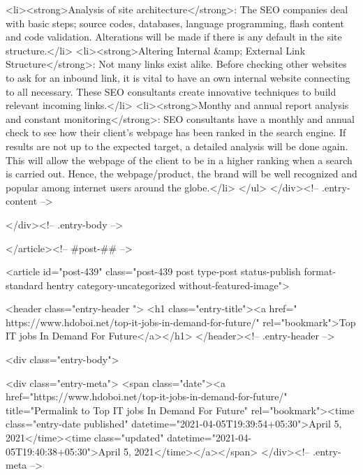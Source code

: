 <li><strong>Analysis of site architecture</strong>: The SEO companies deal with basic steps; source codes, databases, language programming, flash content and code validation. Alterations will be made if there is any default in the site structure.</li>
<li><strong>Altering Internal &amp; External Link Structure</strong>: Not many links exist alike. Before checking other websites to ask for an inbound link, it is vital to have an own internal website connecting to all necessary. These SEO consultants create innovative techniques to build relevant incoming links.</li>
<li><strong>Monthy and annual report analysis and constant monitoring</strong>: SEO consultants have a monthly and annual check to see how their client’s webpage has been ranked in the search engine. If results are not up to the expected target, a detailed analysis will be done again. This will allow the webpage of the client to be in a higher ranking when a search is carried out. Hence, the webpage/product, the brand will be well recognized and popular among internet users around the globe.</li>
</ul>
					</div><!-- .entry-content -->
		
		
			</div><!-- .entry-body -->

</article><!-- #post-## -->

			
				
<article id="post-439" class="post-439 post type-post status-publish format-standard hentry category-uncategorized without-featured-image">

	
	<header class="entry-header ">
					<h1 class="entry-title"><a href=" https://www.hdoboi.net/top-it-jobs-in-demand-for-future/" rel="bookmark">Top IT jobs In Demand For Future</a></h1>			</header><!-- .entry-header -->

	<div class="entry-body">

				<div class="entry-meta">
			<span class="date"><a href="https://www.hdoboi.net/top-it-jobs-in-demand-for-future/" title="Permalink to Top IT jobs In Demand For Future" rel="bookmark"><time class="entry-date published" datetime="2021-04-05T19:39:54+05:30">April 5, 2021</time><time class="updated" datetime="2021-04-05T19:40:38+05:30">April 5, 2021</time></a></span>		</div><!-- .entry-meta -->
		
